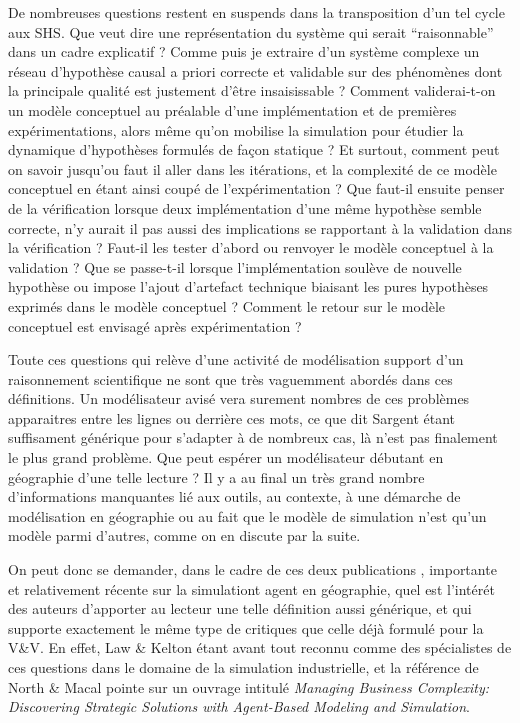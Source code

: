 De nombreuses questions restent en suspends dans la transposition d'un tel cycle aux SHS. Que veut dire une représentation du système qui serait \enquote{raisonnable} dans un cadre explicatif ? Comme puis je extraire d'un système complexe un réseau d'hypothèse causal a priori correcte et validable sur des phénomènes dont la principale qualité est justement d'être insaisissable ? Comment validerai-t-on un modèle conceptuel au préalable d'une implémentation et de premières expérimentations, alors même qu'on mobilise la simulation pour étudier la dynamique d'hypothèses formulés de façon statique ? Et surtout, comment peut on savoir jusqu'ou faut il aller dans les itérations, et la complexité de ce modèle conceptuel en étant ainsi coupé de l'expérimentation ? Que faut-il ensuite penser de la vérification lorsque deux implémentation d'une même hypothèse semble correcte, n'y aurait il pas aussi des implications se rapportant à la validation dans la vérification ? Faut-il les tester d'abord ou renvoyer le modèle conceptuel à la validation ? Que se passe-t-il lorsque l'implémentation soulève de nouvelle hypothèse ou impose l'ajout d'artefact technique biaisant les pures hypothèses exprimés dans le modèle conceptuel ? Comment le retour sur le modèle conceptuel est envisagé après expérimentation ? 

Toute ces questions qui relève d'une activité de modélisation support d'un raisonnement scientifique ne sont que très vaguemment abordés dans ces définitions. Un modélisateur avisé vera surement nombres de ces problèmes apparaitres entre les lignes ou derrière ces mots, ce que dit Sargent étant suffisament générique pour s'adapter à de nombreux cas, là n'est pas finalement le plus grand problème. Que peut espérer un modélisateur débutant en géographie d'une telle lecture ? Il y a au final un très grand nombre d'informations manquantes lié aux outils, au contexte, à une démarche de modélisation en géographie ou au fait que le modèle de simulation n'est qu'un modèle parmi d'autres, comme on en discute par la suite.

On peut donc se demander, dans le cadre de ces deux publications \autocite{Crooks2008,Crooks2012}, importante et relativement récente sur la simulationt agent en géographie, quel est l'intérét des auteurs d'apporter au lecteur une telle définition aussi générique, et qui supporte exactement le même type de critiques que celle déjà formulé pour la V\&V. En effet, Law \& Kelton étant avant tout reconnu comme des spécialistes de ces questions dans le domaine de la simulation industrielle, et la référence de North \& Macal pointe sur un ouvrage intitulé \textit{Managing Business Complexity: Discovering Strategic Solutions with Agent-Based Modeling and Simulation}. 

